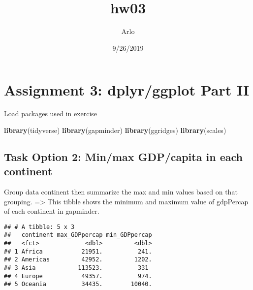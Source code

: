 \documentclass[]{article}
\title{hw03}
\author{Arlo}
\date{9/26/2019}
\newenvironment{Shaded}{\begin{snugshade}}{\end{snugshade}}
\newcommand{\DataTypeTok}[1]{\textcolor[rgb]{0.13,0.29,0.53}{#1}}
\newcommand{\KeywordTok}[1]{\textcolor[rgb]{0.13,0.29,0.53}{\textbf{#1}}}
\newcommand{\NormalTok}[1]{#1}
\newcommand{\OperatorTok}[1]{\textcolor[rgb]{0.81,0.36,0.00}{\textbf{#1}}}
\newcommand{\StringTok}[1]{\textcolor[rgb]{0.31,0.60,0.02}{#1}}
\begin{document}
\maketitle

{
\setcounter{tocdepth}{2}
\tableofcontents
}
\hypertarget{assignment-3-dplyrggplot-part-ii}{%
\section{Assignment 3: dplyr/ggplot Part
II}\label{assignment-3-dplyrggplot-part-ii}}

Load packages used in exercise

\begin{Shaded}
\begin{Highlighting}[]
\KeywordTok{library}\NormalTok{(tidyverse)}
\KeywordTok{library}\NormalTok{(gapminder)}
\KeywordTok{library}\NormalTok{(ggridges)}
\KeywordTok{library}\NormalTok{(scales)}
\end{Highlighting}
\end{Shaded}

\hypertarget{task-option-2-minmax-gdpcapita-in-each-continent}{%
\subsection{Task Option 2: Min/max GDP/capita in each
continent}\label{task-option-2-minmax-gdpcapita-in-each-continent}}

Group data continent then summarize the max and min values based on that
grouping. =\textgreater{} This tibble shows the minimum and maximum
value of gdpPercap of each continent in gapminder.

\begin{Shaded}
\end{Shaded}

\begin{verbatim}
## # A tibble: 5 x 3
##   continent max_GDPpercap min_GDPpercap
##   <fct>             <dbl>         <dbl>
## 1 Africa           21951.          241.
## 2 Americas         42952.         1202.
## 3 Asia            113523.          331 
## 4 Europe           49357.          974.
## 5 Oceania          34435.        10040.
\end{verbatim}
\end{document}
